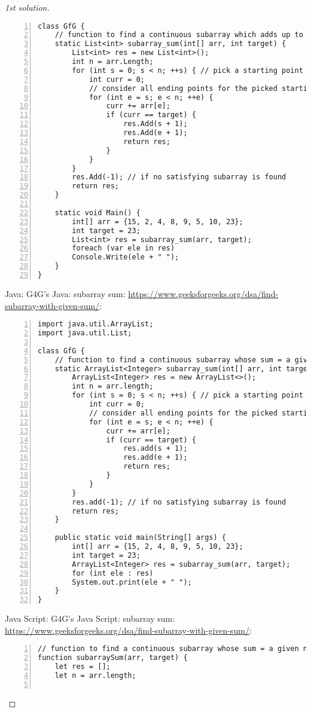 \documentclass{article}
\begin{document}
\begin{proof}[1st solution]
\begin{Verbatim}[numbers=left,xleftmargin=5mm]
class GfG {
    // function to find a continuous subarray which adds up to a given number
    static List<int> subarray_sum(int[] arr, int target) {
        List<int> res = new List<int>();
        int n = arr.Length;
        for (int s = 0; s < n; ++s) { // pick a starting point for a subarray
            int curr = 0;
            // consider all ending points for the picked starting point
            for (int e = s; e < n; ++e) {
                curr += arr[e];
                if (curr == target) {
                    res.Add(s + 1);
                    res.Add(e + 1);
                    return res;
                }
            }
        }
        res.Add(-1); // if no satisfying subarray is found
        return res;
    }

    static void Main() {
        int[] arr = {15, 2, 4, 8, 9, 5, 10, 23};
        int target = 23;
        List<int> res = subarray_sum(arr, target);
        foreach (var ele in res)
        Console.Write(ele + " ");
    }
}
    \end{Verbatim}
    Java: G4G's Java: subarray sum: \url{https://www.geeksforgeeks.org/dsa/find-subarray-with-given-sum/}:
    \begin{Verbatim}[numbers=left,xleftmargin=5mm]
import java.util.ArrayList;
import java.util.List;

class GfG {
    // function to find a continuous subarray whose sum = a given number
    static ArrayList<Integer> subarray_sum(int[] arr, int target) {
        ArrayList<Integer> res = new ArrayList<>();
        int n = arr.length;
        for (int s = 0; s < n; ++s) { // pick a starting point for a subarray
            int curr = 0;
            // consider all ending points for the picked starting point
            for (int e = s; e < n; ++e) {
                curr += arr[e];
                if (curr == target) {
                    res.add(s + 1);
                    res.add(e + 1);
                    return res;
                }
            }
        }
        res.add(-1); // if no satisfying subarray is found
        return res;
    }

    public static void main(String[] args) {
        int[] arr = {15, 2, 4, 8, 9, 5, 10, 23};
        int target = 23;
        ArrayList<Integer> res = subarray_sum(arr, target);
        for (int ele : res)
        System.out.print(ele + " ");
    }
}
    \end{Verbatim}
    Java Script: G4G's Java Script: subarray sum: \url{https://www.geeksforgeeks.org/dsa/find-subarray-with-given-sum/}:
    \begin{Verbatim}[numbers=left,xleftmargin=5mm]
// function to find a continuous subarray whose sum = a given number
function subarraySum(arr, target) {
    let res = [];
    let n = arr.length;


\end{Verbatim}
\end{proof}
\end{document}
